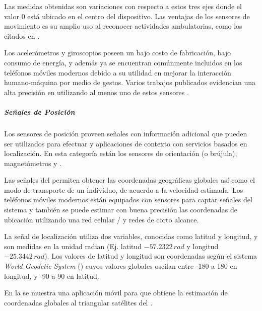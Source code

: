 Las medidas obtenidas son variaciones con respecto a estos tres ejes
donde el valor $0$ está ubicado en el centro del dispositivo. Las
ventajas de los sensores de movimiento es su amplio uso al reconocer
actividades ambulatorias, como los citados en \cite{Bao2004,Kwapisz2011,ReyesOrtiz2015}. 

Los acelerómetros y giroscopios poseen un bajo costo de fabricación,
bajo consumo de energía, y además ya se encuentran comúnmente incluidos
en los teléfonos móviles modernos \cite{Google2016s} debido a su
utilidad en mejorar la interacción humano-máquina por medio de gestos.
Varios trabajos publicados evidencian una alta precisión en 
utilizando al menos uno de estos sensores \cite{Bao2004,LaraLabrador2012}.

\subparagraph{Señales de Posición}

Los sensores de posición proveen señales con información adicional
que pueden ser utilizados para efectuar  y aplicaciones
de contexto con servicios basados en localización. En esta categoría
están los sensores de orientación (o brújula), magnetómetros y 
\cite{Google2016s}.

Las señales del  permiten obtener las coordenadas geográficas
globales así como el modo de transporte de un individuo, de acuerdo
a la velocidad estimada. Los teléfonos móviles modernos están equipados
con sensores para captar señales del sistema  y también
se puede estimar con buena precisión las coordenadas de ubicación
utilizando una red celular / y redes 
de corto alcance. 

La señal de localización utiliza dos variables, conocidas como latitud
y longitud, y son medidas en la unidad radian (Ej. latitud $-57.2322\,rad$
y longitud $-25.3442\,rad$). Los valores de latitud y longitud son
coordenadas según el sistema \emph{World Geodetic System} ()
cuyos valores globales oscilan entre -180 a 180 en longitud, y -90
a 90 en latitud.

En la  se muestra una aplicación móvil para 
que obtiene la estimación de coordenadas globales al triangular satélites
del . 

